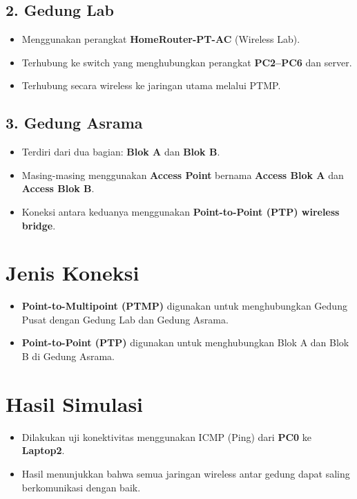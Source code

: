 \subsection*{2. Gedung Lab}
\begin{itemize}
    \item Menggunakan perangkat \textbf{HomeRouter-PT-AC} (Wireless Lab).
    \item Terhubung ke switch yang menghubungkan perangkat \textbf{PC2–PC6} dan server.
    \item Terhubung secara wireless ke jaringan utama melalui PTMP.
\end{itemize}

\subsection*{3. Gedung Asrama}
\begin{itemize}
    \item Terdiri dari dua bagian: \textbf{Blok A} dan \textbf{Blok B}.
    \item Masing-masing menggunakan \textbf{Access Point} bernama \textbf{Access Blok A} dan \textbf{Access Blok B}.
    \item Koneksi antara keduanya menggunakan \textbf{Point-to-Point (PTP) wireless bridge}.
\end{itemize}

\section*{Jenis Koneksi}
\begin{itemize}
    \item \textbf{Point-to-Multipoint (PTMP)} digunakan untuk menghubungkan Gedung Pusat dengan Gedung Lab dan Gedung Asrama.
    \item \textbf{Point-to-Point (PTP)} digunakan untuk menghubungkan Blok A dan Blok B di Gedung Asrama.
\end{itemize}

\section*{Hasil Simulasi}
\begin{itemize}
    \item Dilakukan uji konektivitas menggunakan ICMP (Ping) dari \textbf{PC0} ke \textbf{Laptop2}.
    \item Hasil menunjukkan bahwa semua jaringan wireless antar gedung dapat saling berkomunikasi dengan baik.
\end{itemize}

